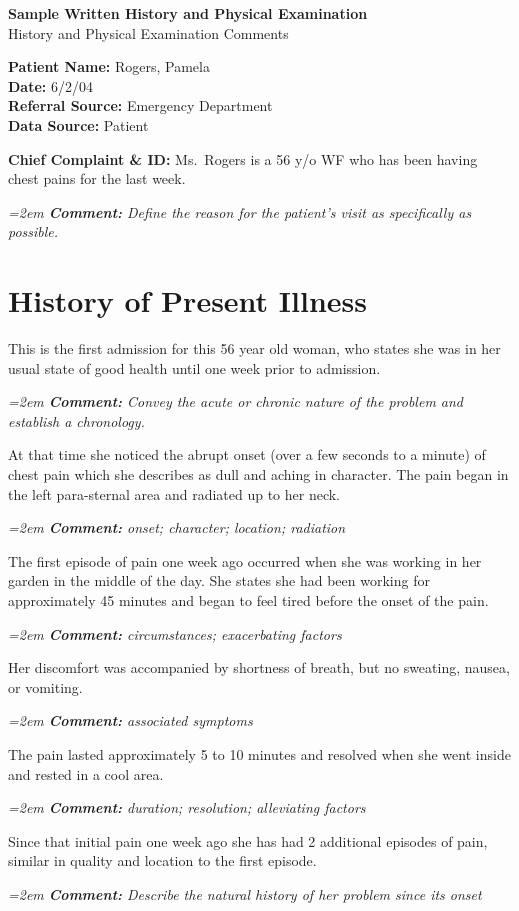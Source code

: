 \documentclass[11pt]{article}
\newcommand{\cm}[1]{%
  \par\nopagebreak\vspace{-0.2em}%
  \begingroup\small\itshape\color{cmtcolor}%
  \hangindent=2em \hangafter=0 \hspace*{1.2em}\textbf{Comment:} #1\par%
  \endgroup}
\begin{document}
\begin{center}
  {\Large\bfseries Sample Written History and Physical Examination}\\[0.4em]
  {\large History and Physical Examination Comments}
\end{center}

\textbf{Patient Name:} Rogers, Pamela\\
\textbf{Date:} 6/2/04\\
\textbf{Referral Source:} Emergency Department\\
\textbf{Data Source:} Patient

\textbf{Chief Complaint \& ID:} Ms.\ Rogers is a 56 y/o WF who has been having chest pains for the last week.
\cm{Define the reason for the patient's visit as specifically as possible.}

\section*{History of Present Illness}

This is the first admission for this 56 year old woman, who states she was in her usual state of good health until one week prior to admission.
\cm{Convey the acute or chronic nature of the problem and establish a chronology.}

At that time she noticed the abrupt onset (over a few seconds to a minute) of chest pain which she describes as dull and aching in character. The pain began in the left para-sternal area and radiated up to her neck.
\cm{onset; character; location; radiation}

The first episode of pain one week ago occurred when she was working in her garden in the middle of the day. She states she had been working for approximately 45 minutes and began to feel tired before the onset of the pain.
\cm{circumstances; exacerbating factors}

Her discomfort was accompanied by shortness of breath, but no sweating, nausea, or vomiting.
\cm{associated symptoms}

The pain lasted approximately 5 to 10 minutes and resolved when she went inside and rested in a cool area.
\cm{duration; resolution; alleviating factors}

Since that initial pain one week ago she has had 2 additional episodes of pain, similar in quality and location to the first episode.
\cm{Describe the natural history of her problem since its onset}
\end{document}
